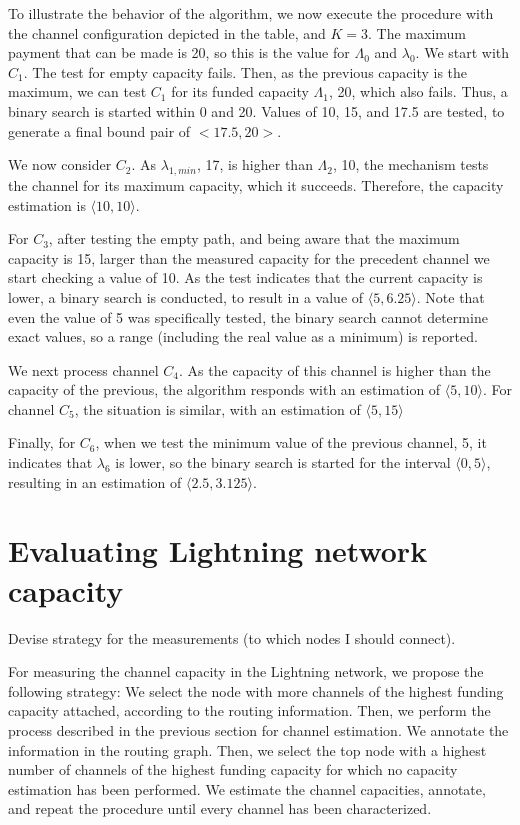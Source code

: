 To illustrate the behavior of the algorithm, we now execute the procedure with the channel configuration depicted in the table, and $K=3$. 
The maximum payment that can be made is 20, so this is the value for $\Lambda_0$ and $\lambda_0$.
We start with $C_1$. The test for empty capacity fails. Then, as the previous capacity is the maximum,
we can test $C_1$ for its funded capacity $\Lambda_1$, 20, which also fails.
Thus, a binary search is started within 0 and 20. Values of 10, 15, and 17.5 are tested, to generate a final bound pair of $<17.5, 20>$.

We now consider $C_2$. As $\lambda_{1,min}$, 17, is higher than $\Lambda_2$, 10, the mechanism tests the channel for its maximum capacity, which it succeeds. Therefore, the capacity estimation is $\langle 10,10 \rangle$.

For $C_3$, after testing the empty path, and being aware that the maximum capacity is 15, larger than the measured capacity for the precedent channel we start checking a value of 10. As the test indicates that the current capacity is lower, a binary search is conducted, to result in a value of $\langle 5, 6.25\rangle$. Note that even the value of 5 was specifically tested, the binary search cannot determine exact values, so a range (including the real value as a minimum) is reported.

We next process channel $C_4$. As the capacity of this channel is higher than the capacity of the previous, the algorithm responds with an estimation of $\langle 5, 10\rangle$.
For channel $C_5$, the situation is similar, with an estimation of $\langle 5, 15\rangle$

Finally, for $C_6$, when we test the minimum value of the previous channel, 5, it indicates that $\lambda_6$ is lower, so the binary search is started for the interval $\langle 0,5\rangle$, resulting in an estimation of $\langle 2.5, 3.125\rangle$.

\section{Evaluating Lightning network capacity}
Devise strategy for the measurements (to which nodes I should connect).

For measuring the channel capacity in the Lightning network, we propose the following strategy: 
We select the node with more channels of the highest funding capacity attached, according to the routing information.    
Then, we perform the process described in the previous section for channel estimation. 
We annotate the information in the routing graph. Then, we select the top node with a highest number of channels of the highest funding capacity for which no capacity estimation has been performed.
We estimate the channel capacities, annotate, and repeat the procedure until every channel has been characterized.

